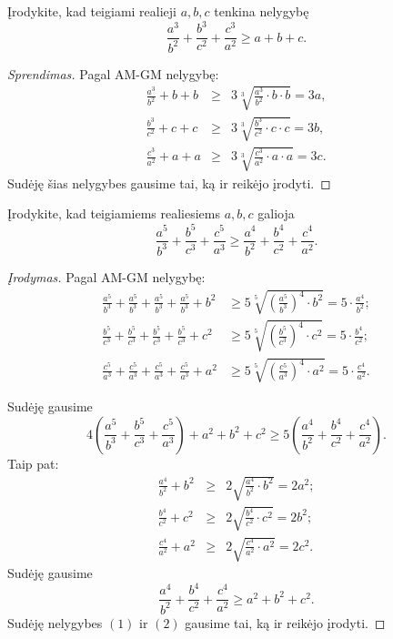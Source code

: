 \begin{pavnr}
  Įrodykite, kad teigiami realieji $a,b,c$ tenkina nelygybę
  $$\frac{a^3}{b^2}+\frac{b^3}{c^2}+\frac{c^3}{a^2}\geq a+b+c.$$
\end{pavnr}

\begin{proof}[Sprendimas]
  Pagal AM-GM nelygybę:
  \begin{eqnarray*}
    \frac{a^3}{b^2}+b+b & \geq & 3\sqrt[3]{\frac{a^3}{b^2}\cdot b\cdot b}=3a, \\
    \frac{b^3}{c^2}+c+c & \geq & 3\sqrt[3]{\frac{b^3}{c^2}\cdot c\cdot c}=3b, \\
    \frac{c^3}{a^2}+a+a & \geq & 3\sqrt[3]{\frac{c^3}{a^2}\cdot a\cdot a}=3c.
  \end{eqnarray*}
  Sudėję šias nelygybes gausime tai, ką ir reikėjo įrodyti.
\end{proof}

\begin{pavnr}
  Įrodykite, kad teigiamiems realiesiems $a,b,c$ galioja
  $$\frac{a^5}{b^3}+\frac{b^5}{c^3}+\frac{c^5}{a^3}\geq\frac{a^4}{b^2}+\frac{b^4}{c^2}+\frac{c^4}{a^2}.$$
\end{pavnr}

\begin{proof}[Įrodymas]
  Pagal AM-GM nelygybę:
  \begin{align*}
     \frac{a^5}{b^3}+\frac{a^5}{b^3}+\frac{a^5}{b^3}+\frac{a^5}{b^3}+b^2 & \geq 5\sqrt[5]{\left(\frac{a^5}{b^3}\right)^4\cdot
b^2}=5\cdot\frac{a^4}{b^2};\\
     \frac{b^5}{c^3}+\frac{b^5}{c^3}+\frac{b^5}{c^3}+\frac{b^5}{c^3}+c^2 & \geq 5\sqrt[5]{\left(\frac{b^5}{c^3}\right)^4\cdot
c^2}=5\cdot\frac{b^4}{c^2};\\
     \frac{c^5}{a^3}+\frac{c^5}{a^3}+\frac{c^5}{a^3}+\frac{c^5}{a^3}+a^2 & \geq 5\sqrt[5]{\left(\frac{c^5}{a^3}\right)^4\cdot
a^2}=5\cdot\frac{c^4}{a^2}.
  \end{align*}

  Sudėję gausime
  \begin{equation}
    4\left(\frac{a^5}{b^3}+\frac{b^5}{c^3}+\frac{c^5}{a^3}\right)+a^2+b^2+c^2\geq5\left(\frac{a^4}{b^2}+\frac{b^4}{c^2}+\frac{c^4}{a^2}\right).\tag{1}
  \end{equation}
  Taip pat:
  \begin{eqnarray*}
    \frac{a^4}{b^2}+b^2 & \geq & 2\sqrt{\frac{a^4}{b^2}\cdot b^2}=2a^2;\\
    \frac{b^4}{c^2}+c^2 & \geq & 2\sqrt{\frac{b^4}{c^2}\cdot c^2}=2b^2;\\
    \frac{c^4}{a^2}+a^2 & \geq & 2\sqrt{\frac{c^4}{a^2}\cdot a^2}=2c^2.
  \end{eqnarray*}
  Sudėję gausime
  \begin{equation}
    \frac{a^4}{b^2}+\frac{b^4}{c^2}+\frac{c^4}{a^2}\geq a^2+b^2+c^2.\tag{2}
  \end{equation}
  Sudėję nelygybes $(1)$ ir $(2)$ gausime tai, ką ir reikėjo įrodyti.
\end{proof}

